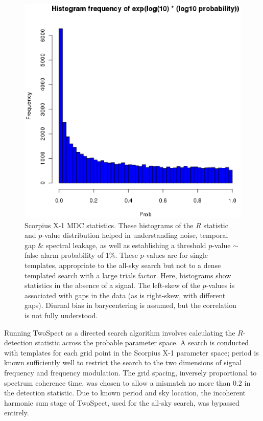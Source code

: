 \begin{figure}
\begin{center}
\includegraphics[width=0.6\paperwidth,height=0.35\paperheight]{StatHistProbH1.eps}
\caption{Scorpius X-1 MDC statistics. These histograms of the $R$ statistic and $p$-value distribution helped in understanding noise, temporal gap \& spectral leakage, as well as establishing a threshold $p$-value $\sim$ false alarm probability of 1\%.
These $p$-values are for single templates, appropriate to the all-sky search but not to a dense templated search with a large trials factor.
Here, histograms show statistics in the absence of a signal. 
The left-skew of the $p$-values is associated with gaps in the data (as is right-skew, with different gaps).
Diurnal bias in barycentering is assumed, but the correlation is not fully understood.
}
\end{center}
\end{figure}



Running TwoSpect as a directed search algorithm involves calculating
the $R$-detection statistic across the probable parameter space. 
A search is conducted with templates for each grid point in the Scorpius 
X-1 parameter space; period is known sufficiently well to restrict the search
to the two dimensions of signal frequency and frequency modulation. The
grid spacing, inversely proportional to spectrum coherence time, was
chosen to allow a mismatch no more than $0.2$ in the detection statistic.
Due to known period and sky location, the incoherent harmonic sum stage
of TwoSpect, used for the all-sky search, was bypassed entirely. 

